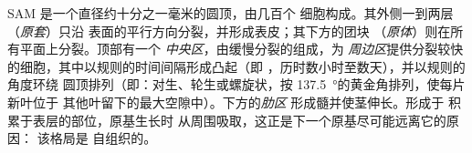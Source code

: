 \begin{proposition}[茎尖]\label{prop:b2:plant-meristems:sam}
SAM 是一个直径约十分之一毫米的圆顶，由几百个
细胞构成。其外侧一到两层（\emph{原套}）只沿
表面的平行方向分裂，并形成表皮；其下方的团块
（\emph{原体}）则在所有平面上分裂。顶部有一个
\emph{中央区}，由缓慢分裂的组成，为
\emph{周边区}提供分裂较快的细胞，其中\emph{}以规则的时间间隔形成凸起（即
\emph{}，历时数小时至数天），并以规则的角度环绕
圆顶排列（即\emph{}：对生、轮生或螺旋状，按
\qty{137.5}{\degree}的黄金角排列，使每片新叶位于
其他叶留下的最大空隙中）。下方的\emph{肋区}
形成髓并使茎伸长。形成于
积累于表层的部位，原基生长时
从周围吸取，这正是下一个原基尽可能远离它的原因：
该格局是
自组织的。
\end{proposition}

